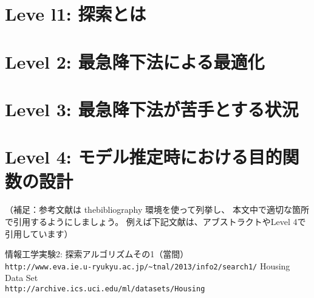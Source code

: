 \documentclass[10pt]{jarticle}
\begin{document}
\newpage

\section{Leve l1: 探索とは}



\newpage

\section{Level 2: 最急降下法による最適化}




\newpage

\section{Level 3: 最急降下法が苦手とする状況}



\newpage

\section{Level 4: モデル推定時における目的関数の設計}




\vspace{+1.0cm}
（補足：参考文献は thebibliography 環境を使って列挙し、
本文中で適切な箇所で引用するようにしましょう。
例えば下記文献は、アブストラクトやLevel 4で引用しています）
\begin{thebibliography}{99}
情報工学実験2: 探索アルゴリズムその1（當間）\\
\verb|http://www.eva.ie.u-ryukyu.ac.jp/~tnal/2013/info2/search1/|
Housing Data Set\\
\verb|http://archive.ics.uci.edu/ml/datasets/Housing|
\end{thebibliography}
\end{document}
